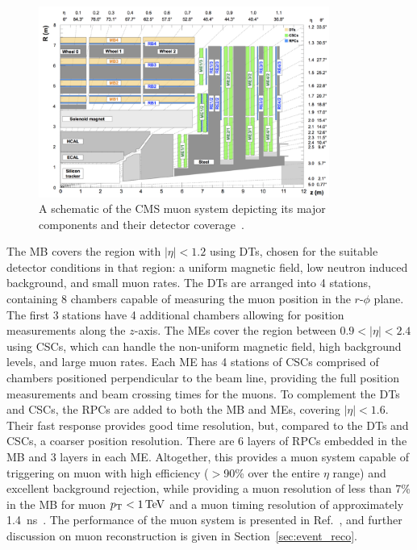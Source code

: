 \begin{figure}[!htb]
	\centering
	\includegraphics[width=0.85\textwidth]{figures/muon_chambers.png}
	\caption{A schematic of the CMS muon system depicting its major components and their detector coverage~\cite{Sirunyan:2018fpa}.}
	\label{fig:muon_system}
\end{figure}

The MB covers the region with $|\eta| < 1.2$ using DTs, chosen for the suitable detector conditions in that region: a uniform magnetic field, low neutron induced background, and small muon rates. The DTs are arranged into 4 stations, containing 8 chambers capable of measuring the muon position in the $r$-$\phi$ plane. The first 3 stations have 4 additional chambers allowing for position measurements along the $z$-axis. The MEs cover the region between $0.9 < |\eta| < 2.4$ using CSCs, which can handle the non-uniform magnetic field, high background levels, and large muon rates. Each ME has 4 stations of CSCs comprised of chambers positioned perpendicular to the beam line, providing the full position measurements and beam crossing times for the muons. To complement the DTs and CSCs, the RPCs are added to both the MB and MEs, covering $|\eta| < 1.6$. Their fast response provides good time resolution, but, compared to the DTs and CSCs, a coarser position resolution. There are 6 layers of RPCs embedded in the MB and 3 layers in each ME. Altogether, this provides a muon system capable of triggering on muon \pt with high efficiency ($>$90\% over the entire $\eta$ range) and excellent background rejection, while providing a muon \pt resolution of less than 7\% in the MB for muon $p_{\mathrm{T}} < 1\,\text{Te\hspace{-.08em}V}$ and a muon timing resolution of approximately 1.4~ns~\cite{Sirunyan:2018fpa}. The performance of the muon system is presented in Ref.~\cite{Sirunyan:2018fpa}, and further discussion on muon reconstruction is given in Section~\ref{sec:event_reco}.


